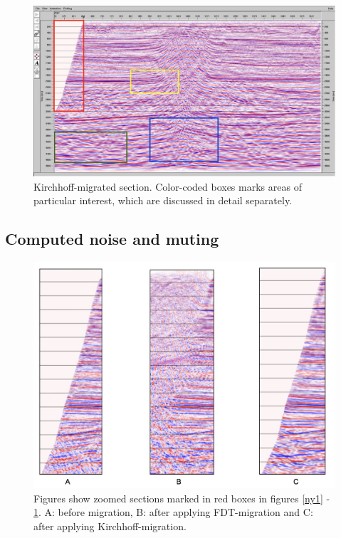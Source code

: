 \documentclass[10pt,a4paper]{article}
\begin{document}
\begin{figure}[H]
\includegraphics[width=\textwidth]{ny3.jpg}
\caption{Kirchhoff-migrated section. Color-coded boxes marks areas of particular interest, which are discussed in detail separately.}
\label{ny3}
\end{figure}

\subsection{Computed noise and muting}

\begin{figure}[H]
\includegraphics[width=\textwidth]{ny4.jpg}
\caption{Figures show zoomed sections marked in red boxes in figures \ref{ny1} - \ref{ny3}. A: before migration, B: after applying FDT-migration and C: after applying Kirchhoff-migration.}
\label{ny4}
\end{figure}
\end{document}
